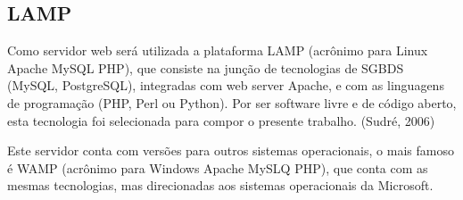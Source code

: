 \documentclass[12pt]{article}
\begin{document}
    \subsection{LAMP}
        Como servidor web será utilizada a plataforma LAMP (acrônimo para Linux Apache MySQL PHP), que consiste na junção de tecnologias de SGBDS (MySQL, PostgreSQL), integradas com web server Apache, e com as linguagens de programação (PHP, Perl ou Python). Por ser software livre e de código aberto, esta tecnologia foi selecionada para compor o presente trabalho. (Sudré, 2006)
        
    	Este servidor conta com  versões para outros sistemas operacionais, o mais famoso é WAMP (acrônimo para Windows Apache MySLQ PHP), que conta com as mesmas tecnologias, mas direcionadas aos sistemas operacionais da Microsoft. 

\nocite{ex1}


\end{document}
